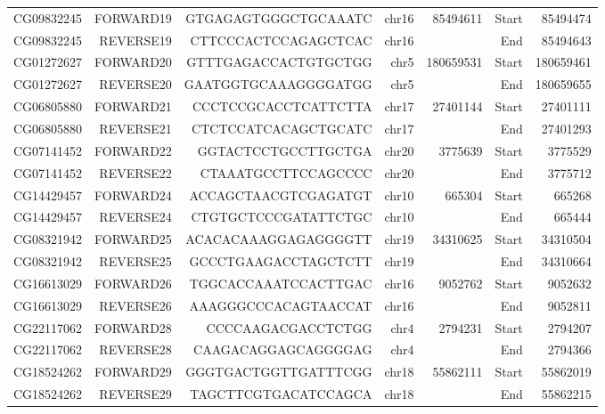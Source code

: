 \begin{table}[htbp]
\begin{tabular}{rrrrrrr}
    CG09832245 & FORWARD19 & GTGAGAGTGGGCTGCAAATC & chr16 & 85494611 & Start & 85494474 \\
    CG09832245 & REVERSE19 & CTTCCCACTCCAGAGCTCAC & chr16 &       & End   & 85494643 \\
    CG01272627 & FORWARD20 & GTTTGAGACCACTGTGCTGG & chr5  & 180659531 & Start & 180659461 \\
    CG01272627 & REVERSE20 & GAATGGTGCAAAGGGGATGG & chr5  &       & End   & 180659655 \\
    CG06805880 & FORWARD21 & CCCTCCGCACCTCATTCTTA & chr17 & 27401144 & Start & 27401111 \\
    CG06805880 & REVERSE21 & CTCTCCATCACAGCTGCATC & chr17 &       & End   & 27401293 \\
    CG07141452 & FORWARD22 & GGTACTCCTGCCTTGCTGA & chr20 & 3775639 & Start & 3775529 \\
    CG07141452 & REVERSE22 & CTAAATGCCTTCCAGCCCC & chr20 &       & End   & 3775712 \\
    CG14429457 & FORWARD24 & ACCAGCTAACGTCGAGATGT & chr10 & 665304 & Start & 665268 \\
    CG14429457 & REVERSE24 & CTGTGCTCCCGATATTCTGC & chr10 &       & End   & 665444 \\
    CG08321942 & FORWARD25 & ACACACAAAGGAGAGGGGTT & chr19 & 34310625 & Start & 34310504 \\
    CG08321942 & REVERSE25 & GCCCTGAAGACCTAGCTCTT & chr19 &       & End   & 34310664 \\
    CG16613029 & FORWARD26 & TGGCACCAAATCCACTTGAC & chr16 & 9052762 & Start & 9052632 \\
    CG16613029 & REVERSE26 & AAAGGGCCCACAGTAACCAT & chr16 &       & End   & 9052811 \\
    CG22117062 & FORWARD28 & CCCCAAGACGACCTCTGG & chr4  & 2794231 & Start & 2794207 \\
    CG22117062 & REVERSE28 & CAAGACAGGAGCAGGGGAG & chr4  &       & End   & 2794366 \\
    CG18524262 & FORWARD29 & GGGTGACTGGTTGATTTCGG & chr18 & 55862111 & Start & 55862019 \\
    CG18524262 & REVERSE29 & TAGCTTCGTGACATCCAGCA & chr18 &       & End   & 55862215 \\
    \bottomrule
    \end{tabular}%
  \label{tab:primerTable}%
\end{table}%
